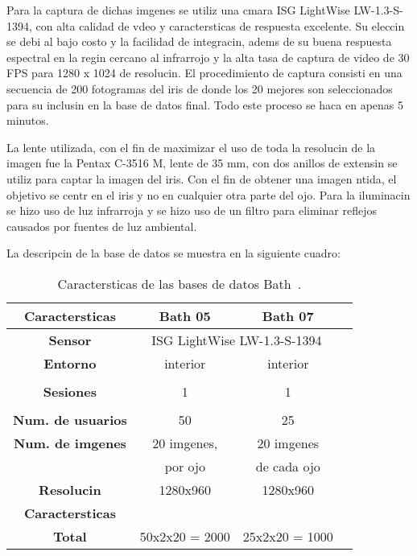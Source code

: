Para la captura de dichas imgenes se utiliz una cmara ISG LightWise LW-1.3-S-1394, con alta calidad de vdeo y caractersticas de respuesta excelente. Su eleccin se debi al bajo costo y la facilidad de integracin, adems de su buena respuesta espectral en la regin cercano al infrarrojo y la alta tasa de captura de video de 30 FPS para 1280 x 1024 de resolucin. El procedimiento de captura consisti en una secuencia de 200 fotogramas del iris de donde los 20 mejores son seleccionados para su inclusin en la base de datos final. Todo este proceso se haca en apenas 5 minutos.

La lente utilizada, con el fin de maximizar el uso de toda la resolucin de la imagen fue la Pentax C-3516 M, lente de 35 mm, con dos anillos de extensin se utiliz para captar la imagen del iris. Con el fin de obtener una imagen ntida, el objetivo se centr en el iris y no en cualquier otra parte del ojo. Para la iluminacin se hizo uso de luz infrarroja y se hizo uso de un filtro para eliminar reflejos causados por fuentes de luz ambiental.

La descripcin de la base de datos se muestra en la siguiente cuadro:

\vspace{1cm}

\begin{table}[h]
    \centering
    \scriptsize
    \begin{tabular}{|c|c|c|c|}
        \hline
        \textbf{Caractersticas}   & \textbf{Bath 05}      &  \textbf{Bath 07}       \\
        \hline
        \textbf{Sensor}            & \multicolumn{2}{|c|}{ISG LightWise LW-1.3-S-1394}\\
        \hline
        \textbf{Entorno}           & interior               & interior        \\
        \hline
                                   &                        &                 \\
        \textbf{Sesiones}          & 1                      & 1               \\
                                   &                        &              \\
        \hline
        \textbf{Num. de usuarios}  & 50                     & 25              \\
        \hline
        \textbf{Num. de imgenes}  & 20 imgenes,           & 20 imgenes  \\
                                   & por ojo                & de cada ojo \\
        \hline
        \textbf{Resolucin}        & 1280x960                & 1280x960         \\
        \hline
        \textbf{Caractersticas}   &                        &                 \\
        \hline
        \textbf{Total}             & 50x2x20 = 2000       & 25x2x20 = 1000    \\
        \hline
    \end{tabular}
    \caption{Caractersticas de las bases de datos Bath~\citet{database:UniversityBath_web}.}
    \label{table:info_bath}
\end{table}


